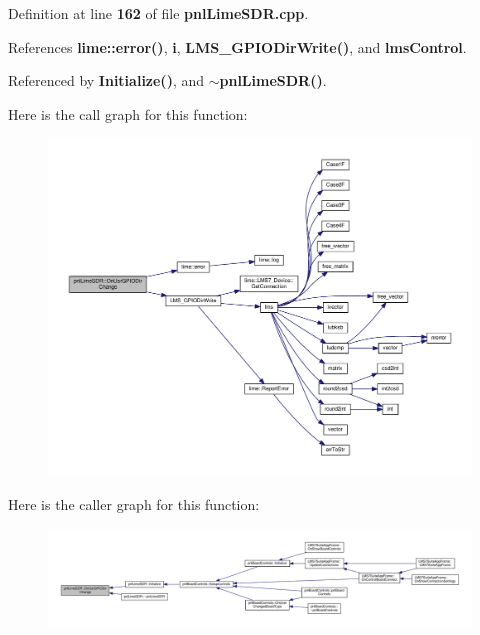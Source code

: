 Definition at line {\bf 162} of file {\bf pnl\+Lime\+S\+D\+R.\+cpp}.



References {\bf lime\+::error()}, {\bf i}, {\bf L\+M\+S\+\_\+\+G\+P\+I\+O\+Dir\+Write()}, and {\bf lms\+Control}.



Referenced by {\bf Initialize()}, and {\bf $\sim$pnl\+Lime\+S\+D\+R()}.



Here is the call graph for this function\+:
\nopagebreak
\begin{figure}[H]
\begin{center}
\leavevmode
\includegraphics[width=350pt]{de/d23/classpnlLimeSDR_af8f59e014c5bb8bfd5fc11c5e9358a3d_cgraph}
\end{center}
\end{figure}




Here is the caller graph for this function\+:
\nopagebreak
\begin{figure}[H]
\begin{center}
\leavevmode
\includegraphics[width=350pt]{de/d23/classpnlLimeSDR_af8f59e014c5bb8bfd5fc11c5e9358a3d_icgraph}
\end{center}
\end{figure}


